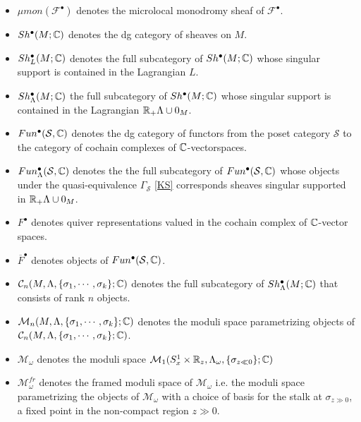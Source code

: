 \begin{itemize}
\item $\mu mon(\mathscr{F}^\bullet)$ denotes the microlocal monodromy sheaf of $\mathscr{F}^\bullet$.

\item $Sh^\bullet(M;\mathbb{C})$ denotes the dg category of sheaves on $M$.

\item $Sh^\bullet_L(M;\mathbb{C})$ denotes the full subcategory of $Sh^\bullet(M;\mathbb{C})$ whose singular support is contained in the Lagrangian $L$.

\item $Sh^\bullet_\Lambda(M;\mathbb{C})$ the full subcategory of $Sh^\bullet(M;\mathbb{C})$ whose singular support is contained in the Lagrangian $\mathbb{R}_+ \Lambda \cup 0_M$.

\item $Fun^\bullet(\mathcal{S},\mathbb{C})$ denotes the dg category of functors from the poset category $\mathcal{S}$ to the category of cochain complexes of $\mathbb{C}$-vectorspaces.

\item $Fun^\bullet_\Lambda(\mathcal{S},\mathbb{C})$ denotes the the full subcategory of $Fun^\bullet(\mathcal{S},\mathbb{C})$ whose objects under the quasi-equivalence $\Gamma_\mathcal{S}$ \ref{KS} corresponds sheaves singular supported in $\mathbb{R}_+ \Lambda \cup 0_M$.

\item $F^\bullet$ denotes quiver representations valued in the cochain complex of $\mathbb{C}$-vector spaces.

\item $\overline{F}^\bullet$ denotes objects of $Fun^\bullet(\mathcal{S},\mathbb{C})$.

\item $\mathcal{C}_n(M,\Lambda,\{\sigma_1,\cdots,\sigma_k\};\mathbb{C})$ denotes the full subcategory of $Sh^\bullet_\Lambda(M;\mathbb{C})$ that consists of rank $n$ objects.

\item $\mathcal{M}_n(M,\Lambda,\{\sigma_1,\cdots,\sigma_k\};\mathbb{C})$ denotes the moduli space parametrizing objects of $\mathcal{C}_n(M,\Lambda,\{\sigma_1,\cdots,\sigma_k\};\mathbb{C})$.

\item $\mathcal{M}_\omega$ denotes the moduli space $\mathcal{M}_1(S^1_x \times \mathbb{R}_z,\Lambda_\omega,\{\sigma_{z\ll 0}\};\mathbb{C})$

\item $\mathcal{M}_\omega^{fr}$ denotes the framed moduli space of $\mathcal{M}_\omega$ i.e. the moduli space parametrizing the objects of $\mathcal{M}_\omega$ with a choice of basis for the stalk at $\sigma_{z\gg 0}$, a fixed point in the non-compact region $z\gg 0$.


\end{itemize}
